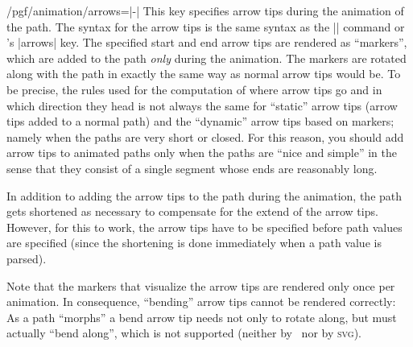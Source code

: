\begin{key}{/pgf/animation/arrows=|-|}
    This key specifies arrow tips during the animation of the path. The syntax
    for the arrow tips is the same syntax as the |\pgfsetarrow| command or
    \tikzname's |arrows| key.  The specified start and end arrow tips are
    rendered as ``markers'', which are added to the path \emph{only} during the
    animation. The markers are rotated along with the path in exactly the  same
    way as normal arrow tips would be. To be precise, the rules used for the
    computation of where arrow tips go and in which direction they head is not
    always the same for ``static'' arrow tips (arrow tips added to a normal
    path) and the ``dynamic'' arrow tips based on markers; namely when the
    paths are very short or closed. For this reason, you should add arrow tips
    to animated paths only when the paths are ``nice and simple'' in the sense
    that they consist of a single segment whose ends are reasonably long.

    In addition to adding the arrow tips to the path during the animation, the
    path gets shortened as necessary to compensate for the extend of the arrow
    tips. However, for this to work, the arrow tips have to be specified before
    path values are specified (since the shortening is done immediately when a
    path value is parsed).
\begin{codeexample}[
    preamble={\usepgfmodule{animations}},
    animation list={0,1,2,3,4},
    animation bb={(0.9,-0.1)rectangle(2.1,1.1)},
]
\end{codeexample}

    Note that the markers that visualize the arrow tips are rendered only once
    per animation. In consequence, ``bending'' arrow tips cannot be rendered
    correctly: As a path ``morphs'' a bend arrow tip needs not only to rotate
    along, but must actually ``bend along'', which is not supported (neither by
    \pgfname\ nor by \textsc{svg}).


\end{key}
